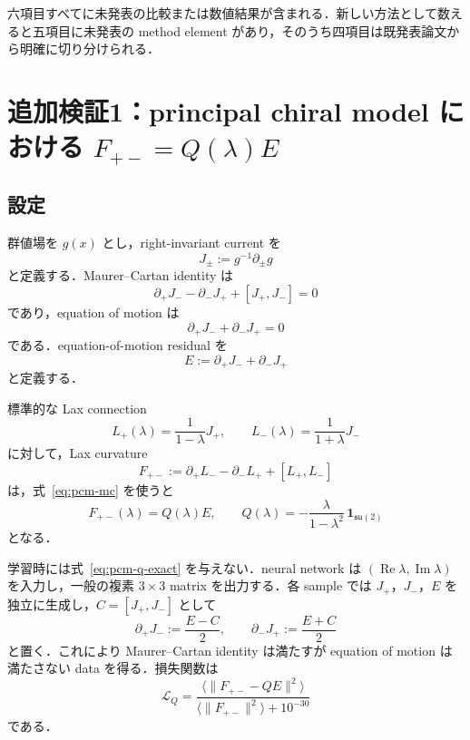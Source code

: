\documentclass[11pt,a4paper]{ltjsarticle}
\begin{document}
六項目すべてに未発表の比較または数値結果が含まれる．新しい方法として数えると五項目に未発表の method element があり，そのうち四項目は既発表論文から明確に切り分けられる．

\section{追加検証1：principal chiral model における $F_{+-}=Q(\lambda)E$}

\subsection{設定}

群値場を $g(x)$ とし，right-invariant current を
\begin{equation}
J_\pm:=g^{-1}\partial_\pm g
\end{equation}
と定義する．Maurer--Cartan identity は
\begin{equation}
\partial_+J_- - \partial_-J_+ +[J_+,J_-]=0
\label{eq:pcm-mc}
\end{equation}
であり，equation of motion は
\begin{equation}
\partial_+J_-+\partial_-J_+=0
\end{equation}
である．equation-of-motion residual を
\begin{equation}
E:=\partial_+J_-+\partial_-J_+
\end{equation}
と定義する．

標準的な Lax connection
\begin{equation}
L_+(\lambda)=\frac{1}{1-\lambda}J_+,
\qquad
L_-(\lambda)=\frac{1}{1+\lambda}J_-
\end{equation}
に対して，Lax curvature
\begin{equation}
F_{+-}:=\partial_+L_- -\partial_-L_+ +[L_+,L_-]
\end{equation}
は，式~\eqref{eq:pcm-mc} を使うと
\begin{equation}
F_{+-}(\lambda)=Q(\lambda)E,
\qquad
Q(\lambda)=-\frac{\lambda}{1-\lambda^2}\,\mathbf 1_{\mathfrak{su}(2)}
\label{eq:pcm-q-exact}
\end{equation}
となる．

学習時には式~\eqref{eq:pcm-q-exact} を与えない．neural network は $(\operatorname{Re}\lambda,\operatorname{Im}\lambda)$ を入力し，一般の複素 $3\times3$ matrix を出力する．各 sample では $J_+$，$J_-$，$E$ を独立に生成し，$C=[J_+,J_-]$ として
\begin{equation}
\partial_+J_-:=\frac{E-C}{2},
\qquad
\partial_-J_+:=\frac{E+C}{2}
\end{equation}
と置く．これにより Maurer--Cartan identity は満たすが equation of motion は満たさない data を得る．損失関数は
\begin{equation}
\mathcal L_Q=
\frac{\langle\lVert F_{+-}-QE\rVert^2\rangle}
{\langle\lVert F_{+-}\rVert^2\rangle+10^{-30}}
\end{equation}
である．
\end{document}
